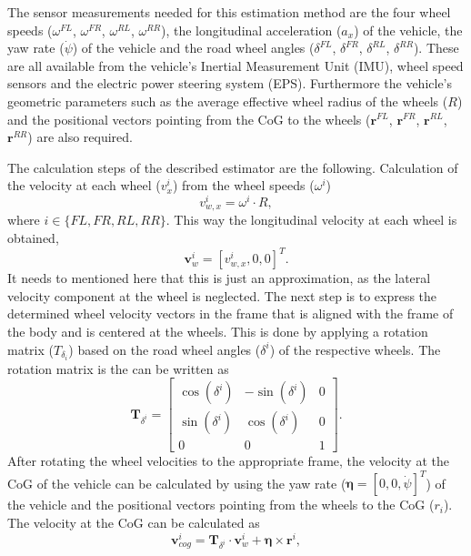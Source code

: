 The sensor measurements needed for this estimation method are the four wheel speeds ($\omega^{FL}$, $\omega^{FR}$, $\omega^{RL}$, $\omega^{RR}$), the longitudinal acceleration ($a_x$) of the vehicle, the yaw rate ($\dot \psi$) of the vehicle and the road wheel angles ($\delta^{FL}$, $\delta^{FR}$, $\delta^{RL}$, $\delta^{RR}$). These are all available from the vehicle's Inertial Measurement Unit (IMU), wheel speed sensors and the electric power steering system (EPS). Furthermore the vehicle's geometric parameters such as the average effective wheel radius of the wheels ($R$) and the positional vectors pointing from the CoG to the wheels ($\mathbf{r}^{FL}$, $\mathbf{r}^{FR}$, $\mathbf{r}^{RL}$, $\mathbf{r}^{RR}$) are also required. 

The calculation steps of the described estimator are the following. Calculation of the velocity at each wheel ($v_x^i$) from the wheel speeds ($\omega^i$) 
\begin{equation}
    v_{w,x}^{i} = \omega^i \cdot R,
\end{equation}
where $i \in \{FL, FR, RL, RR\}$. This way the longitudinal velocity at each wheel is obtained,
\begin{equation}
    \mathbf{v}_{w}^{i} = [v_{w,x}^{i}, 0, 0]^T.
\end{equation}
It needs to mentioned here that this is just an approximation, as the lateral velocity component at the wheel is neglected. The next step is to express the determined wheel velocity vectors in the frame that is aligned with the frame of the body and is centered at the wheels. This is done by applying a rotation matrix ($T_{\delta_i}$) based on the road wheel angles ($\delta^i$) of the respective wheels. The rotation matrix is the can be written as
\begin{equation}
    \mathbf{T}_{\delta^i} = \begin{bmatrix}
    \cos(\delta^i) & -\sin(\delta^i) & 0 \\
    \sin(\delta^i) & \cos(\delta^i) & 0 \\
    0 & 0 & 1
    \end{bmatrix}.
    \label{eq:rotation_matrix}
\end{equation}
After rotating the wheel velocities to the appropriate frame, the velocity at the CoG of the vehicle can be calculated by using the yaw rate ($\boldsymbol{\eta} = [0,0,\dot \psi]^T$) of the vehicle and the positional vectors pointing from the wheels to the CoG ($r_i$). The velocity at the CoG can be calculated as
\begin{equation}
    \mathbf{v}_{cog}^{i} = \mathbf{T}_{\delta^i} \cdot \mathbf{v}_{w}^{i} + \boldsymbol{\eta} \times \mathbf{r}^i,
\end{equation}
